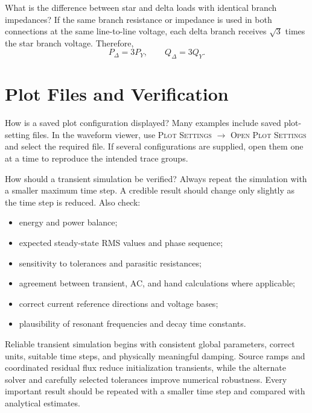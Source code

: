 \begin{formulaBox}{What is the difference between star and delta loads with identical branch impedances?}
If the same branch resistance or impedance is used in both connections at the
same line-to-line voltage, each delta branch receives $\sqrt{3}$ times the star
branch voltage. Therefore,
\begin{equation}
P_\Delta=3P_Y,
\qquad Q_\Delta=3Q_Y.
\end{equation}
\end{formulaBox}

\section{Plot Files and Verification}

\begin{formulaBox}{How is a saved plot configuration displayed?}
Many examples include saved plot-setting files. In the waveform viewer, use
\textsc{Plot Settings} $\rightarrow$ \textsc{Open Plot Settings} and select
the required file. If several configurations are supplied, open them one at a
time to reproduce the intended trace groups.
\end{formulaBox}

\begin{formulaBox}{How should a transient simulation be verified?}
Always repeat the simulation with a smaller maximum time step. A credible
result should change only slightly as the time step is reduced. Also check:
\begin{itemize}
\item energy and power balance;
\item expected steady-state RMS values and phase sequence;
\item sensitivity to tolerances and parasitic resistances;
\item agreement between transient, AC, and hand calculations where applicable;
\item correct current reference directions and voltage bases;
\item plausibility of resonant frequencies and decay time constants.
\end{itemize}
\end{formulaBox}

\begin{chaptersummary}
Reliable transient simulation begins with consistent global parameters,
correct units, suitable time steps, and physically meaningful damping. Source
ramps and coordinated residual flux reduce initialization transients, while
the alternate solver and carefully selected tolerances improve numerical
robustness. Every important result should be repeated with a
smaller time step and compared with analytical estimates.
\end{chaptersummary}
